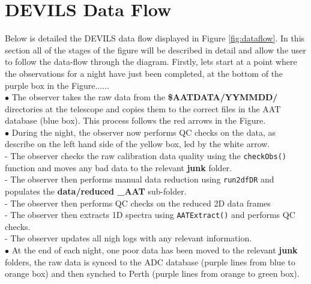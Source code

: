 \documentclass[12pt]{article}
\begin{document}
\section{DEVILS Data Flow}
\label{sec:dataflow}

Below is detailed the DEVILS data flow displayed in Figure \ref{fig:dataflow}. In this section all of the stages of the figure will be described in detail and allow the user to follow the data-flow through the diagram. Firstly, lets start at a point where the observations for a night have just been completed, at the bottom of the purple box in the Figure...... \\

$\bullet$ The observer takes the raw data from the \textbf{\$AATDATA/YYMMDD/} directories at the telescope and copies them to the correct files in the AAT database (blue box). This process follows the red arrows in the Figure. \\

$\bullet$ During the night, the observer now performs QC checks on the data, as describe on the left hand side of the yellow box, led by the white arrow. \\

\hspace{10mm} - The observer checks the raw calibration data quality using the \texttt{checkObs()} function and moves any bad data to the relevant \textbf{junk} folder.\\

\hspace{10mm} - The observer then performs manual data reduction using \texttt{run2dfDR} and populates the \textbf{data/reduced \_AAT} sub-folder. \\

\hspace{10mm} - The observer then performs QC checks on the reduced 2D data frames\\

\hspace{10mm} - The observer then extracts 1D spectra using  \texttt{AATExtract()} and performs QC checks.\\

\hspace{10mm} - The observer updates all nigh logs with any relevant information.\\

$\bullet$ At the end of each night, one poor data has been moved to the relevant \textbf{junk} folders, the raw data is synced to the ADC database (purple lines from blue to orange box) and then synched to Perth (purple lines from orange to green box). \\
\end{document}
